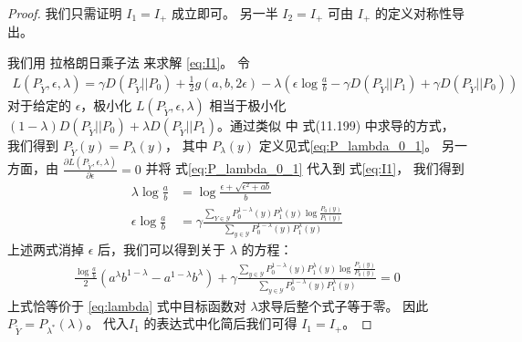     \begin{proof}
        我们只需证明 $I_1=I_+$ 成立即可。
另一半 $I_2=I_+$ 可由 $I_+$ 的定义对称性导出。

我们用 拉格朗日乘子法 来求解 \eqref{eq:I1}。
令
\begin{align*}
L(P_{\widetilde{Y}},\epsilon, \lambda)
=\gamma D(P_{\widetilde{Y}}|| P_0)+
\frac{1}{2} g(a,b, 2\epsilon)
- \lambda(\epsilon \log\frac{a}{b}-\gamma
D(P_{\widetilde{Y}} || P_1) + \gamma D(P_{\widetilde{Y}} || P_0))
\end{align*}
对于给定的 $\epsilon$，极小化 $L(P_{\widetilde{Y}},\epsilon, \lambda)$
相当于极小化
$(1-\lambda)D(P_{\widetilde{Y}} || P_0) +
\lambda D(P_{\widetilde{Y}} || P_1) $。通过类似
\citet{cover1999elements} 中 式(11.199) 中求导的方式，
我们得到 $P_{\widetilde{Y}}(y) = P_{\lambda}(y)$，
其中 $P_{\lambda}(y)$ 定义见式\eqref{eq:P_lambda_0_1}。
另一方面，由 $\frac{\partial L(P_{\widetilde{Y}},\epsilon, \lambda)}{\partial \epsilon}=0$
并将 式\eqref{eq:P_lambda_0_1}
代入到 式\eqref{eq:I1}， 我们得到
\begin{align*}
    \lambda \log \frac{a}{b}
    & = \log \frac{\epsilon + \sqrt{\epsilon^2+ab}}{b} \\
    \epsilon \log \frac{a}{b}
    & = \gamma\frac{\sum_{Y \in \mathcal{Y}}P_0^{1-\lambda}(y) P_1^{\lambda} (y)
    \log \frac{P_0(y)}{P_1(y)}}{\sum_{y \in \mathcal{Y}}
    P_0^{1-\lambda}(y) P_1^{\lambda} (y)}
\end{align*}
上述两式消掉 $\epsilon$ 后，我们可以得到关于
$\lambda$ 的方程：
\begin{align*}
    \frac{\log\frac{a}{b}}{2}
    (a^{\lambda} b^{1-\lambda}
    -a^{1-\lambda} b^{\lambda})
    + \gamma \frac{\sum_{y \in \mathcal{Y}}
    P_0^{1-\lambda}(y) P_1^{\lambda}(y)
    \log \frac{P_1(y)}{P_0(y)}}
    {\sum_{y \in \mathcal{Y}}P_0^{1-\lambda}(y)
    P_1^{\lambda} (y)}
    =0
\end{align*}
上式恰等价于 \eqref{eq:lambda} 式中目标函数对 $\lambda$求导后整个式子等于零。
因此$P_{\widetilde{Y}}=P_{\lambda^*}(\lambda)$。
代入$I_1$ 的表达式中化简后我们可得
$I_1 = I_+$。
\end{proof}
